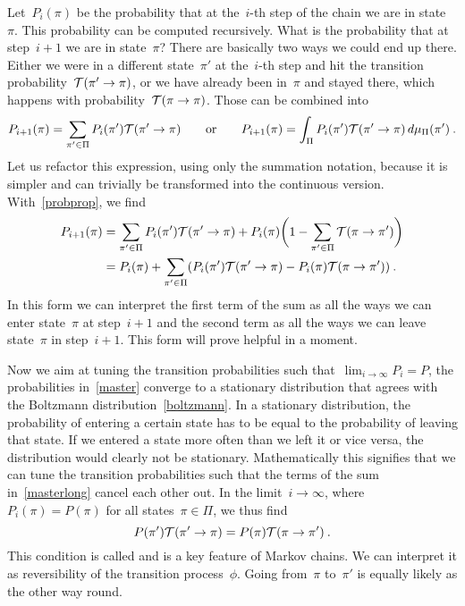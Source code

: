 Let~$P_i(\pi)$ be the probability that at the~$i$-th step of
the chain we are in state~$\pi$. This probability can be computed recursively.
What is the probability that at step~$i+1$ we are in state~$\pi$? There are
basically two ways we could end up there. Either we were in a different
state~$\pi'$ at the~$i$-th step and hit the transition probability~$\mathcal{T}(\pi' \to
\pi)$, or we have already been in~$\pi$ and stayed there, which happens with
probability~$\mathcal{T}(\pi \to \pi)$. Those can be combined into
%
\begin{equation}\label{master}
  P_{i+1}(\pi) = \sum_{\pi' \in \Pi} P_i(\pi') \mathcal{T}(\pi' \to \pi) \qquad\text{or}\qquad
  P_{i+1}(\pi) = \int_{\Pi} P_i(\pi') \mathcal{T}(\pi' \to \pi) \,d\mu_{\Pi}(\pi')\:.
\end{equation}
%
Let us refactor this expression, using only the summation notation, because it
is simpler and can trivially be transformed into the continuous version.
With~\eqref{probprop}, we find
%
\begin{align}\label{masterlong}
  P_{i+1}(\pi) &= \sum_{\pi' \in \Pi} P_i(\pi') \mathcal{T}(\pi' \to \pi) +
    P_i(\pi) \biggl(1 - \sum_{\pi' \in \Pi} \mathcal{T}(\pi \to \pi')\biggr)\nonumber \\
  &= P_i(\pi) + \sum_{\pi' \in \Pi}
    (P_i(\pi') \mathcal{T}(\pi' \to \pi) - P_i(\pi) \mathcal{T}(\pi \to \pi'))\:.
\end{align}
%
In this form we can interpret the first term of the sum as all the ways we can
enter state~$\pi$ at step~$i+1$ and the second term as all the ways we can leave
state~$\pi$ in step~$i+1$. This form will prove helpful in a moment.

Now we aim at tuning the transition probabilities such that~$\lim_{i \to \infty}
P_i = P$, \ie{} the probabilities in~\eqref{master} converge to a stationary
distribution that agrees with the Boltzmann distribution~\eqref{boltzmann}. In a
stationary distribution, the probability of entering a certain state has to be
equal to the probability of leaving that state. If we entered a state more often
than we left it or vice versa, the distribution would clearly not be stationary.
Mathematically this signifies that we can tune the transition probabilities such
that the terms of the sum in~\eqref{masterlong} cancel each other out. In the
limit~$i \to \infty$, where~$P_i(\pi) = P(\pi)$ for all states~$\pi \in \Pi$, we
thus find
%
\begin{equation}\label{detbal}
  P(\pi') \mathcal{T}(\pi' \to \pi) = P(\pi) \mathcal{T}(\pi \to \pi')\:.
\end{equation}
%
This condition is called  and is a key feature of
Markov chains. We can interpret it as reversibility of the transition
process~$\phi$. Going from~$\pi$ to~$\pi'$ is equally likely as the other way
round.

